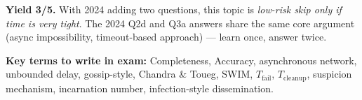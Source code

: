 \documentclass[12pt,a4paper]{article}
\begin{document}
\begin{notesbox}
\textbf{Yield 3/5.} With 2024 adding two questions, this topic is \emph{low-risk skip only
if time is very tight}. The 2024 Q2d and Q3a answers share the same core argument
(async impossibility, timeout-based approach) — learn once, answer twice.

\textbf{Key terms to write in exam:}
Completeness, Accuracy, asynchronous network, unbounded delay, gossip-style,
Chandra \& Toueg, SWIM, $T_{\text{fail}}$, $T_{\text{cleanup}}$, suspicion mechanism,
incarnation number, infection-style dissemination.
\end{notesbox}
\end{document}
